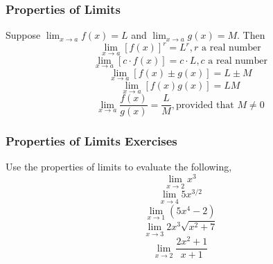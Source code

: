\documentclass[xcolor=dvipsnames]{beamer}
\begin{document}
\begin{frame}
  \frametitle{Properties of Limits}
  Suppose $\lim_{x\rightarrow{}a}f(x)=L$ and
  $\lim_{x\rightarrow{}a}g(x)=M$. Then
\begin{equation}
  \label{eq:johvoohu}
  \lim_{x\rightarrow{}a}[f(x)]^{r}=L^{r},r\mbox{ a real number}
\end{equation}
\begin{equation}
  \label{eq:eeyootoh}
  \lim_{x\rightarrow{}a}[c\cdot{}f(x)]=c\cdot{}L,c\mbox{ a real number}
\end{equation}
\begin{equation}
  \label{eq:kohzahwa}
  \lim_{x\rightarrow{}a}[f(x)\pm{}g(x)]=L\pm{}M
\end{equation}
\begin{equation}
  \label{eq:aekaqued}
  \lim_{x\rightarrow{}a}[f(x)g(x)]=LM
\end{equation}
\begin{equation}
  \label{eq:ahkeigae}
  \lim_{x\rightarrow{}a}\frac{f(x)}{g(x)}=\frac{L}{M},\mbox{provided that }M\neq{}0
\end{equation}
\end{frame}

\begin{frame}
  \frametitle{Properties of Limits Exercises}
Use the properties of limits to evaluate the following,
\begin{equation}
  \label{eq:eemoopha}
 \lim_{x\rightarrow{}2}x^{3} 
\end{equation}
\begin{equation}
  \label{eq:queebaet}
 \lim_{x\rightarrow{}4}5x^{3/2} 
\end{equation}
\begin{equation}
  \label{eq:xoquaenu}
 \lim_{x\rightarrow{}1}\left(5x^{4} -2\right)
\end{equation}
\begin{equation}
  \label{eq:othahzau}
 \lim_{x\rightarrow{}3}2x^{3}\sqrt{x^{2}+7}
\end{equation}
\begin{equation}
  \label{eq:ayaivoma}
 \lim_{x\rightarrow{}2}\frac{2x^{2}+1}{x+1}
\end{equation}
\end{frame}
\end{document}
